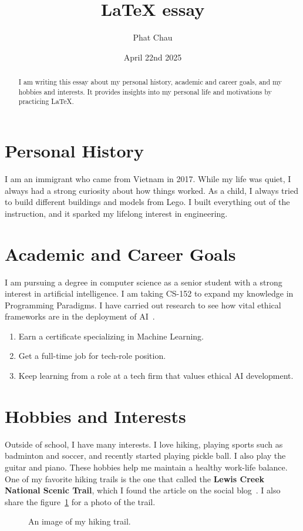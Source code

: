 \documentclass{article}
\title{LaTeX essay}
\author{Phat Chau}
\date{April 22nd 2025}
\begin{document}
\maketitle
\begin{abstract}
I am writing this essay about my personal history, academic and career goals, and my hobbies and interests. It provides insights into my personal life and motivations by practicing LaTeX.
\end{abstract}
    
\section{Personal History}
I am an immigrant who came from Vietnam in 2017. While my life was quiet, I always had a strong curiosity about how things worked. As a child, I always tried to build different buildings and models from Lego. I built everything out of the instruction, and it sparked my lifelong interest in engineering.
    
\section{Academic and Career Goals}
I am pursuing a degree in computer science as a senior student with a strong interest in artificial intelligence. I am taking CS-152 to expand my knowledge in Programming Paradigms. I have carried out research to see how vital ethical frameworks are in the deployment of AI~\cite{DBLP:journals/access/NetturKNG25}.
    
\begin{enumerate}[label=\arabic*.]
    \item Earn a certificate specializing in Machine Learning.
    \item Get a full-time job for tech-role position.
    \item Keep learning from a role at a tech firm that values ethical AI development.
\end{enumerate}
    
    
\section{Hobbies and Interests}
Outside of school, I have many interests. I love hiking, playing sports such as badminton and soccer, and recently started playing pickle ball. I also play the guitar and piano. These hobbies help me maintain a healthy work-life balance.
One of my favorite hiking trails is the one that called the \textbf{Lewis Creek National Scenic Trail}, which I found the article on the social blog~\cite{Gorgeous-Day-Hikes-in-California's-Sierra-Mountains}. I also share the figure~\ref{fig:loop} for a photo of the trail.

\begin{figure}[h]
  \centering
  \caption{An image of my hiking trail.}
  \label{fig:loop}
\end{figure}

\newpage



\end{document}
